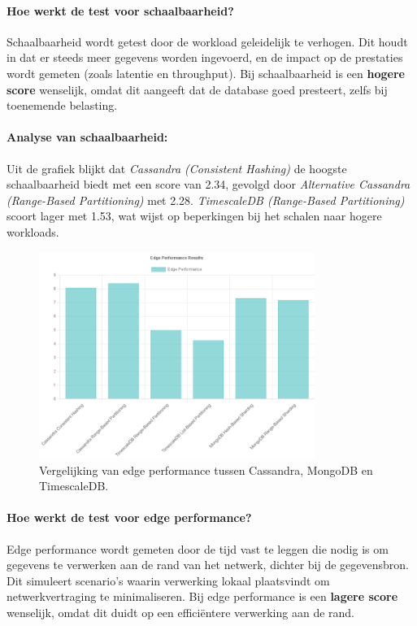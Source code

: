 \paragraph{Hoe werkt de test voor schaalbaarheid?} 
Schaalbaarheid wordt getest door de workload geleidelijk te verhogen. Dit houdt in dat er steeds meer gegevens worden ingevoerd, en de impact op de prestaties wordt gemeten (zoals latentie en throughput). Bij schaalbaarheid is een \textbf{hogere score} wenselijk, omdat dit aangeeft dat de database goed presteert, zelfs bij toenemende belasting.

\paragraph{Analyse van schaalbaarheid:}
Uit de grafiek blijkt dat \textit{Cassandra (Consistent Hashing)} de hoogste schaalbaarheid biedt met een score van 2.34, gevolgd door \textit{Alternative Cassandra (Range-Based Partitioning)} met 2.28. \textit{TimescaleDB (Range-Based Partitioning)} scoort lager met 1.53, wat wijst op beperkingen bij het schalen naar hogere workloads.

\begin{figure}[H]
	\centering
	\includegraphics[width=0.8\textwidth]{Edge_Performance.png}
	\caption{Vergelijking van edge performance tussen Cassandra, MongoDB en TimescaleDB.}
	\label{fig:edgeperformance-comparison}
\end{figure}

\paragraph{Hoe werkt de test voor edge performance?} 
Edge performance wordt gemeten door de tijd vast te leggen die nodig is om gegevens te verwerken aan de rand van het netwerk, dichter bij de gegevensbron. Dit simuleert scenario's waarin verwerking lokaal plaatsvindt om netwerkvertraging te minimaliseren. Bij edge performance is een \textbf{lagere score} wenselijk, omdat dit duidt op een efficiëntere verwerking aan de rand.

